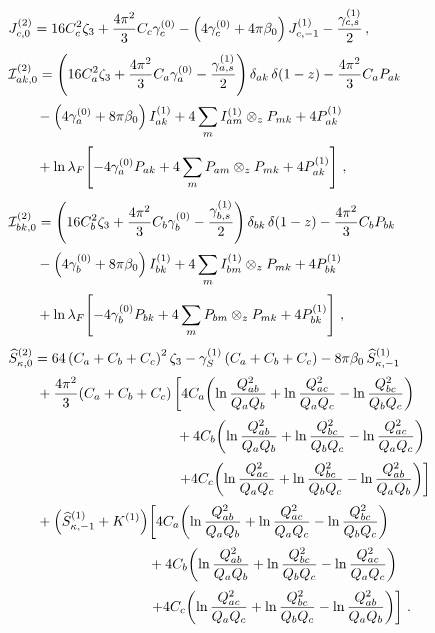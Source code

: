 \begin{subequations}
\label{eq:C20-ingred}
\begin{align}
&J_{c,0}^{(2)} = 16C_c^2\zeta_3+\frac{4\pi^2}{3}C_c\gamma_c^{(0)}
    -\left(4\gamma_c^{(0)}+4\pi\beta_0\right)J_{c,-1}^{(1)}
    -\frac{\gamma_{c,s}^{(1)}}{2}\,, \\[1ex]
&\mathcal{I}_{ak,0}^{(2)} =
    \left(16C_a^2\zeta_3+\frac{4\pi^2}{3}C_a\gamma_a^{(0)}
    -\frac{\gamma_{a,s}^{(1)}}{2}\right)\delta_{ak}\,\delta(1-z)
    -\frac{4\pi^2}{3}C_a P_{ak} \notag\\[0.5ex]
  &\qquad-\left(4\gamma_a^{(0)}+8\pi\beta_0\right)I_{ak}^{(1)}
    +4\sum_m I_{am}^{(1)}\otimes_z P_{mk}+4P_{ak}^{(1)} \notag\\[0.5ex]
  &\qquad+\ln\lambda_F\!\left[-4\gamma_a^{(0)}P_{ak}
    +4\sum_m P_{am}\otimes_z P_{mk}+4P_{ak}^{(1)}\right]\,, \\[1ex]
&\mathcal{I}_{bk,0}^{(2)} =
    \left(16C_b^2\zeta_3+\frac{4\pi^2}{3}C_b\gamma_b^{(0)}
    -\frac{\gamma_{b,s}^{(1)}}{2}\right)\delta_{bk}\,\delta(1-z)
    -\frac{4\pi^2}{3}C_b P_{bk} \notag\\[0.5ex]
  &\qquad-\left(4\gamma_b^{(0)}+8\pi\beta_0\right)I_{bk}^{(1)}
    +4\sum_m I_{bm}^{(1)}\otimes_z P_{mk}+4P_{bk}^{(1)} \notag\\[0.5ex]
  &\qquad+\ln\lambda_F\!\left[-4\gamma_b^{(0)}P_{bk}
    +4\sum_m P_{bm}\otimes_z P_{mk}+4P_{bk}^{(1)}\right]\,, \\[1ex]
&\widehat{S}_{\kappa,0}^{(2)} =
    64\left(C_a+C_b+C_c\right)^2\zeta_3-\gamma_S^{(1)}\left(C_a+C_b+C_c\right)
    -8\pi\beta_0\,\widehat{S}_{\kappa,-1}^{(1)} \notag\\[0.5ex]
  &\qquad+\frac{4\pi^2}{3}(C_a+C_b+C_c)\left[
    4C_a\!\left(\ln\frac{Q_{ab}^2}{Q_a Q_b}
    +\ln\frac{Q_{ac}^2}{Q_a Q_c}-\ln\frac{Q_{bc}^2}{Q_b Q_c}\right)\right. \notag\\[0.5ex]
  &\qquad\qquad\qquad\qquad\qquad\qquad+4C_b\!\left(\ln\frac{Q_{ab}^2}{Q_a Q_b}
    +\ln\frac{Q_{bc}^2}{Q_b Q_c}-\ln\frac{Q_{ac}^2}{Q_a Q_c}\right) \notag\\[0.5ex]
  &\left.\qquad\qquad\qquad\qquad\qquad\qquad+4C_c\!\left(\ln\frac{Q_{ac}^2}{Q_a Q_c}
    +\ln\frac{Q_{bc}^2}{Q_b Q_c}
    -\ln\frac{Q_{ab}^2}{Q_a Q_b}\right)\right] \notag\\[0.5ex]
  &\qquad+\left(\widehat{S}_{\kappa,-1}^{(1)}+K^{(1)}\right)\!\left[
    4C_a\!\left(\ln\frac{Q_{ab}^2}{Q_a Q_b}
    +\ln\frac{Q_{ac}^2}{Q_a Q_c}-\ln\frac{Q_{bc}^2}{Q_b Q_c}\right)\right. \notag\\[0.5ex]
  &\qquad\qquad\qquad\qquad\qquad+4C_b\!\left(\ln\frac{Q_{ab}^2}{Q_a Q_b}
    +\ln\frac{Q_{bc}^2}{Q_b Q_c}-\ln\frac{Q_{ac}^2}{Q_a Q_c}\right) \notag\\[0.5ex]
  &\left.\qquad\qquad\qquad\qquad\qquad+4C_c\!\left(\ln\frac{Q_{ac}^2}{Q_a Q_c}
    +\ln\frac{Q_{bc}^2}{Q_b Q_c}
    -\ln\frac{Q_{ab}^2}{Q_a Q_b}\right)\right]\,.
\end{align}
\end{subequations}
